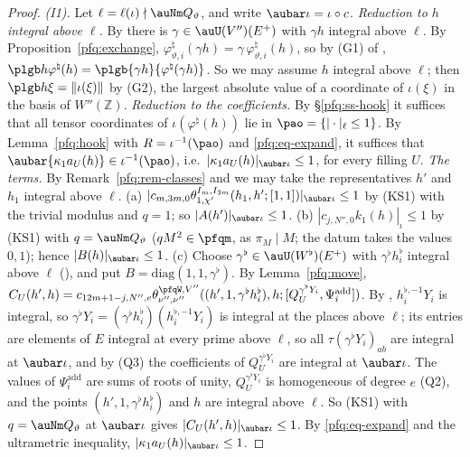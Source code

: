 \documentclass[10pt]{amsart}
\theoremstyle{definition}
\theoremstyle{remark}
\newcommand{\Z}{\mathbb Z}
\begin{document}
\begin{proof}
\emph{(I1).} Let $\ell=\ell(\iota)\nmid\auNm Q_\vartheta$, and write $\aubar\iota=\iota\circ c$.
\emph{Reduction to $h$ integral above $\ell$.} By {\cite[Corollary~6.4(a)]{P49}} there is $\gamma\in\auU(V'')(E^+)$ with $\gamma h$
integral above $\ell$. By Proposition~\ref{pfq:exchange}, $\varphi^\natural_{\vartheta,i}(\gamma h)=\gamma\,\varphi^\natural_{\vartheta,i}(h)$, so by (G1) of
{\cite[\S6.1]{P49}}, $\plgb h{\varphi^\natural(h)}=\plgb{\gamma h}{\varphi^\natural(\gamma h)}$. So we may assume $h$ integral above $\ell$;
then $\plgb h\xi=\|\iota(\xi)\|$ by (G2), the largest absolute value of a coordinate of $\iota(\xi)$ in the basis of $W''(\Z)$.
\emph{Reduction to the coefficients.} By \S\ref{pfq:ss-hook} it suffices that all tensor coordinates of $\iota(\varphi^\natural(h))$ lie
in $\pao=\{|\cdot|_\ell\le1\}$. By Lemma~\ref{pfq:hook} with $R=\iota^{-1}(\pao)$ and \eqref{pfq:eq-expand}, it suffices that
$\aubar{\kappa_1a_U(h)}\in\iota^{-1}(\pao)$, i.e.\ $|\kappa_1a_U(h)|_{\aubar\iota}\le1$, for every filling $U$.
\emph{The terms.} By Remark~\ref{pfq:rem-classes} and {\cite[Corollary~6.4(a)]{P49}} we may take the representatives $h'$ and $h_1$
integral above $\ell$. (a) $|c_{m,3m,0}\theta^{I_m,I_{3m}}_{1,\chi'}(h_1,h';[1,1])|_{\aubar\iota}\le1$ by (KS1) with the trivial modulus
and $q=1$; so $|A(h')|_{\aubar\iota}\le1$. (b) $|c_{j,N'',0}k_1(h)|_\iota\le1$ by (KS1) with $q=\auNm Q_\vartheta$ ($qM^2\in\pfqm$, as
$\pi_M\mid M$; the datum takes the values $0,1$); hence $|B(h)|_{\aubar\iota}\le1$. (c) Choose $\gamma^\flat\in\auU(W^\flat)(E^+)$ with
$\gamma^\flat h^\flat_i$ integral above $\ell$ ({\cite[Corollary~6.4(a)]{P49}}), and put $B=\mathrm{diag}(1,1,\gamma^\flat)$. By
Lemma~\ref{pfq:move}, $C_U(h',h)=c_{12m+1-j,N'',e}\theta^{\pfqW,V''}_{\nu'',\nu''}((h',1,\gamma^\flat h^\flat_i),h;[Q^{\gamma^\flat Y_i}_U,
\Psi^{\mathrm{add}}_i])$. By {\cite[Lemma~14.21]{P46}}, $h^{\flat,-1}_iY_i$ is integral, so $\gamma^\flat Y_i=(\gamma^\flat h^\flat_i)
(h^{\flat,-1}_iY_i)$ is integral at the places above $\ell$; its entries are elements of $E$ integral at every prime above $\ell$,
so all $\tau(\gamma^\flat Y_i)_{ab}$ are integral at $\aubar\iota$, and by (Q3) the coefficients of $Q^{\gamma^\flat Y_i}_U$ are
integral at $\aubar\iota$. The values of $\Psi^{\mathrm{add}}_i$ are sums of roots of unity, $Q^{\gamma^\flat Y_i}_U$ is homogeneous of
degree $e$ (Q2), and the points $(h',1,\gamma^\flat h^\flat_i)$ and $h$ are integral above $\ell$. So (KS1) with $q=\auNm Q_\vartheta$ at
$\aubar\iota$ gives $|C_U(h',h)|_{\aubar\iota}\le1$. By \eqref{pfq:eq-expand} and the ultrametric inequality,
$|\kappa_1a_U(h)|_{\aubar\iota}\le1$.


\end{proof}
\end{document}
